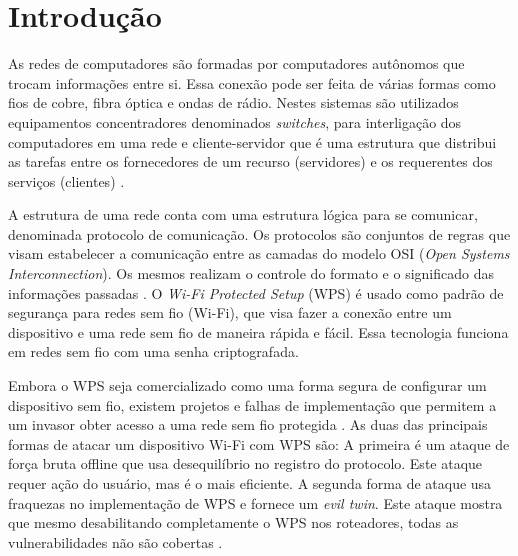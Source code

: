 \documentclass[
	article,			%
	11pt,				%
	oneside,			%
	a4paper,			%
	english,			%
	brazil,				%
	sumario=tradicional
	]{abntex2}
\begin{document}

\textual

\section{Introdução}
As redes de computadores são formadas por computadores autônomos que trocam informações entre si. Essa conexão pode ser feita de várias formas como fios de cobre, fibra óptica e ondas de rádio. Nestes sistemas são utilizados equipamentos concentradores denominados \textit{switches}, para interligação dos computadores em uma rede e cliente-servidor que é uma estrutura que distribui as tarefas entre os fornecedores de um recurso (servidores) e os requerentes dos serviços (clientes) \cite{tanenbaum2011redes}. 

A estrutura de uma rede conta com uma estrutura lógica para se comunicar, denominada protocolo de comunicação. Os protocolos são conjuntos de regras que visam estabelecer a comunicação entre as camadas do modelo OSI (\textit{Open Systems Interconnection}). Os mesmos realizam o controle do formato e o significado das informações passadas \cite{tanenbaum2011redes}. O \textit{Wi-Fi Protected Setup} (WPS) é usado como padrão de segurança para redes sem fio (Wi-Fi), que visa fazer a conexão entre um dispositivo e uma rede sem fio de maneira rápida e fácil. Essa tecnologia funciona em redes sem fio com uma senha criptografada.

Embora o WPS seja comercializado como uma forma segura de configurar um dispositivo sem fio, existem projetos e falhas de implementação que permitem a um invasor obter acesso a uma rede sem fio protegida \cite{viehbock2011brute}. As duas das principais formas de atacar um dispositivo Wi-Fi com WPS são: A primeira é um ataque de força bruta offline que usa desequilíbrio no registro do protocolo. Este ataque requer ação do usuário, mas é o mais eficiente. A segunda forma de ataque usa fraquezas no implementação de WPS e fornece um \textit{evil twin}. Este ataque mostra que mesmo desabilitando completamente o WPS nos roteadores, todas as vulnerabilidades não são cobertas \cite{mohtadi2015new}.
\end{document}
